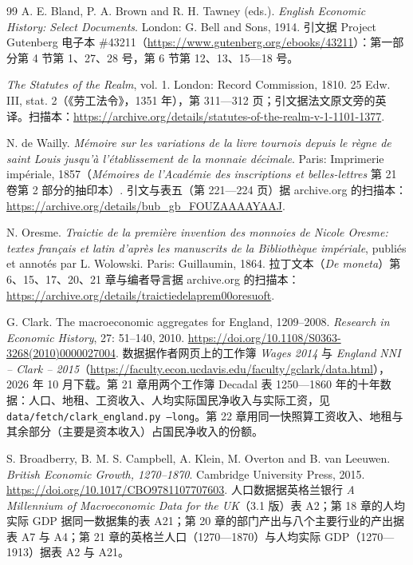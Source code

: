 \begin{thebibliography}{99}
 A. E. Bland, P. A. Brown and R. H. Tawney (eds.). \emph{English Economic History: Select Documents}. London: G. Bell and Sons, 1914. 引文据 Project Gutenberg 电子本 \#43211（\url{https://www.gutenberg.org/ebooks/43211}）：第一部分第 4 节第 1、27、28 号，第 6 节第 12、13、15—18 号。

 \emph{The Statutes of the Realm}, vol. 1. London: Record Commission, 1810. 25 Edw. III, stat. 2（《劳工法令》，1351 年），第 311—312 页；引文据法文原文旁的英译。扫描本：\url{https://archive.org/details/statutes-of-the-realm-v-1-1101-1377}.

 N. de Wailly. \emph{Mémoire sur les variations de la livre tournois depuis le règne de saint Louis jusqu'à l'établissement de la monnaie décimale}. Paris: Imprimerie impériale, 1857（\emph{Mémoires de l'Académie des inscriptions et belles-lettres} 第 21 卷第 2 部分的抽印本）. 引文与表五（第 221—224 页）据 archive.org 的扫描本：\url{https://archive.org/details/bub_gb_FOUZAAAAYAAJ}.

 N. Oresme. \emph{Traictie de la première invention des monnoies de Nicole Oresme: textes français et latin d'après les manuscrits de la Bibliothèque impériale}, publiés et annotés par L. Wolowski. Paris: Guillaumin, 1864. 拉丁文本（\emph{De moneta}）第 6、15、17、20、21 章与编者导言据 archive.org 的扫描本：\url{https://archive.org/details/traictiedelaprem00oresuoft}.

 G. Clark. The macroeconomic aggregates for England, 1209--2008. \emph{Research in Economic History}, 27: 51--140, 2010. \url{https://doi.org/10.1108/S0363-3268(2010)0000027004}. 数据据作者网页上的工作簿 \emph{Wages 2014} 与 \emph{England NNI -- Clark -- 2015}（\url{https://faculty.econ.ucdavis.edu/faculty/gclark/data.html}），2026 年 10 月下载。第 21 章用两个工作簿 Decadal 表 1250—1860 年的十年数据：人口、地租、工资收入、人均实际国民净收入与实际工资，见 \texttt{data/fetch/clark\_england.py --long}。第 22 章用同一快照算工资收入、地租与其余部分（主要是资本收入）占国民净收入的份额。

 S. Broadberry, B. M. S. Campbell, A. Klein, M. Overton and B. van Leeuwen. \emph{British Economic Growth, 1270--1870}. Cambridge University Press, 2015. \url{https://doi.org/10.1017/CBO9781107707603}. 人口数据据英格兰银行 \emph{A Millennium of Macroeconomic Data for the UK}（3.1 版）表 A2；第 18 章的人均实际 GDP 据同一数据集的表 A21；第 20 章的部门产出与八个主要行业的产出据表 A7 与 A4；第 21 章的英格兰人口（1270—1870）与人均实际 GDP（1270—1913）据表 A2 与 A21。


\end{thebibliography}

